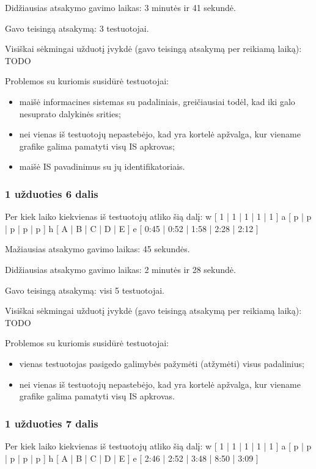 Didžiausias atsakymo gavimo laikas: 3 minutės ir 41 sekundė.

Gavo teisingą atsakymą: 3 testuotojai.

Visiškai sėkmingai užduotį įvykdė (gavo teisingą atsakymą per reikiamą 
laiką): TODO

Problemos su kuriomis susidūrė testuotojai:
\begin{itemize}
  \item maišė informacines sistemas su padaliniais, greičiausiai todėl,
    kad iki galo nesuprato dalykinės srities;
  \item nei vienas iš testuotojų nepastebėjo, kad yra kortelė apžvalga,
    kur viename grafike galima pamatyti visų IS apkrovas;
  \item maišė IS pavadinimus su jų identifikatoriais.
\end{itemize}

\subsubsection{1 užduoties 6 dalis}

Per kiek laiko kiekvienas iš testuotojų atliko šią dalį:
\xtable
{
  w [ 1 | 1 | 1 | 1 | 1 ]
  a [ p | p | p | p | p ]
  h [ A | B | C | D | E ]
  e [ 0:45 | 0:52 | 1:58 | 2:28 | 2:12 ]
}

Mažiausias atsakymo gavimo laikas: 45 sekundės.

Didžiausias atsakymo gavimo laikas: 2 minutės ir 28 sekundė.

Gavo teisingą atsakymą: visi 5 testuotojai.

Visiškai sėkmingai užduotį įvykdė (gavo teisingą atsakymą per reikiamą 
laiką): TODO

Problemos su kuriomis susidūrė testuotojai:
\begin{itemize}
  \item vienas testuotojas pasigedo galimybės pažymėti (atžymėti) visus
    padalinius;
  \item nei vienas iš testuotojų nepastebėjo, kad yra kortelė apžvalga,
    kur viename grafike galima pamatyti visų IS apkrovas.
\end{itemize}

\subsubsection{1 užduoties 7 dalis}

Per kiek laiko kiekvienas iš testuotojų atliko šią dalį:
\xtable
{
  w [ 1 | 1 | 1 | 1 | 1 ]
  a [ p | p | p | p | p ]
  h [ A | B | C | D | E ]
  e [ 2:46 | 2:52 | 3:48 | 8:50 | 3:09 ]
}

